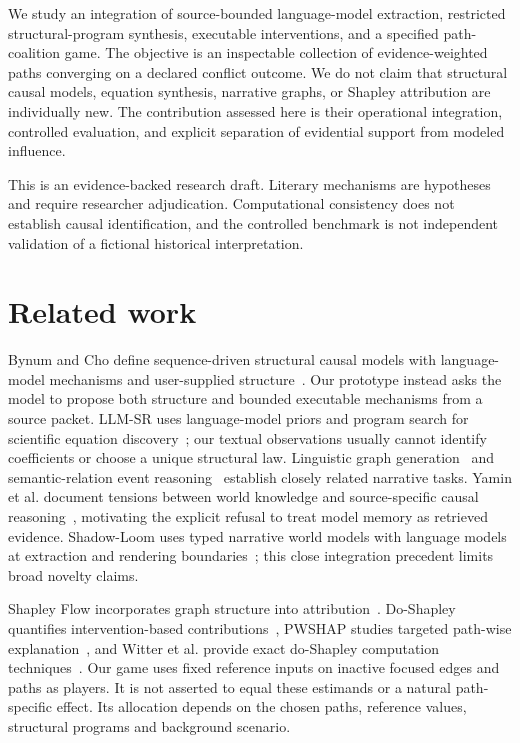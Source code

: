 \documentclass{svproc}
\begin{document}
We study an integration of source-bounded language-model extraction, restricted structural-program synthesis, executable interventions, and a specified path-coalition game. The objective is an inspectable collection of evidence-weighted paths converging on a declared conflict outcome. We do not claim that structural causal models, equation synthesis, narrative graphs, or Shapley attribution are individually new. The contribution assessed here is their operational integration, controlled evaluation, and explicit separation of evidential support from modeled influence.

This is an evidence-backed research draft. Literary mechanisms are hypotheses and require researcher adjudication. Computational consistency does not establish causal identification, and the controlled benchmark is not independent validation of a fictional historical interpretation.

\section{Related work}
Bynum and Cho define sequence-driven structural causal models with language-model mechanisms and user-supplied structure~\cite{bynum}. Our prototype instead asks the model to propose both structure and bounded executable mechanisms from a source packet. LLM-SR uses language-model priors and program search for scientific equation discovery~\cite{shojaee}; our textual observations usually cannot identify coefficients or choose a unique structural law. Linguistic graph generation~\cite{li} and semantic-relation event reasoning~\cite{koupaee} establish closely related narrative tasks. Yamin et al. document tensions between world knowledge and source-specific causal reasoning~\cite{yamin}, motivating the explicit refusal to treat model memory as retrieved evidence. Shadow-Loom uses typed narrative world models with language models at extraction and rendering boundaries~\cite{wilmot}; this close integration precedent limits broad novelty claims.

Shapley Flow incorporates graph structure into attribution~\cite{wang}. Do-Shapley quantifies intervention-based contributions~\cite{jung}, PWSHAP studies targeted path-wise explanation~\cite{terminassian}, and Witter et al. provide exact do-Shapley computation techniques~\cite{witter}. Our game uses fixed reference inputs on inactive focused edges and paths as players. It is not asserted to equal these estimands or a natural path-specific effect. Its allocation depends on the chosen paths, reference values, structural programs and background scenario.
\end{document}
